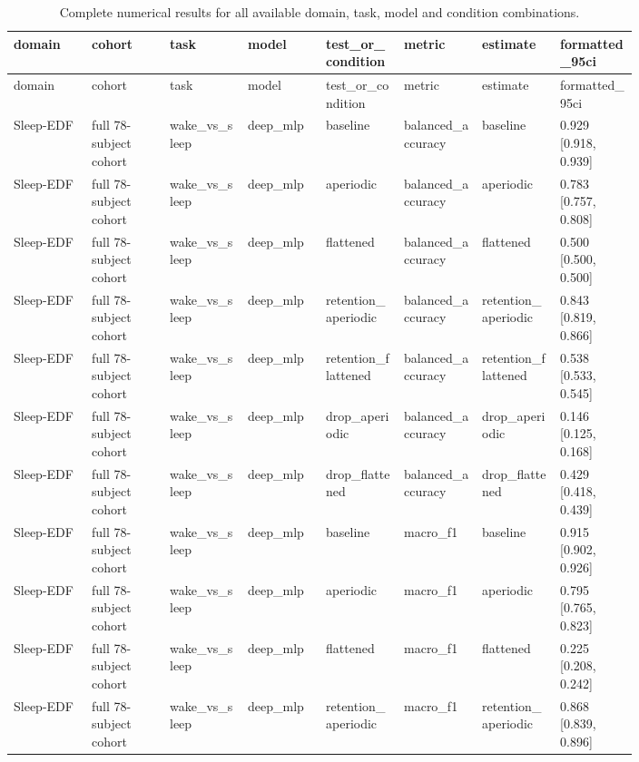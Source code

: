 \begin{longtable}{p{0.10\linewidth}p{0.10\linewidth}p{0.10\linewidth}p{0.10\linewidth}p{0.10\linewidth}p{0.10\linewidth}p{0.10\linewidth}p{0.10\linewidth}}
\caption{Complete numerical results for all available domain, task, model and condition combinations.}\label{tab:supp_complete_results}\\
\toprule
domain & cohort & task & model & test\_or\_condition & metric & estimate & formatted\_95ci\\
\midrule
\endfirsthead
\toprule
domain & cohort & task & model & test\_or\_condition & metric & estimate & formatted\_95ci\\
\midrule
\endhead
Sleep-EDF & full 78-subject cohort & wake\_vs\_sleep & deep\_mlp & baseline & balanced\_accuracy & baseline & 0.929 [0.918, 0.939]\\
Sleep-EDF & full 78-subject cohort & wake\_vs\_sleep & deep\_mlp & aperiodic & balanced\_accuracy & aperiodic & 0.783 [0.757, 0.808]\\
Sleep-EDF & full 78-subject cohort & wake\_vs\_sleep & deep\_mlp & flattened & balanced\_accuracy & flattened & 0.500 [0.500, 0.500]\\
Sleep-EDF & full 78-subject cohort & wake\_vs\_sleep & deep\_mlp & retention\_aperiodic & balanced\_accuracy & retention\_aperiodic & 0.843 [0.819, 0.866]\\
Sleep-EDF & full 78-subject cohort & wake\_vs\_sleep & deep\_mlp & retention\_flattened & balanced\_accuracy & retention\_flattened & 0.538 [0.533, 0.545]\\
Sleep-EDF & full 78-subject cohort & wake\_vs\_sleep & deep\_mlp & drop\_aperiodic & balanced\_accuracy & drop\_aperiodic & 0.146 [0.125, 0.168]\\
Sleep-EDF & full 78-subject cohort & wake\_vs\_sleep & deep\_mlp & drop\_flattened & balanced\_accuracy & drop\_flattened & 0.429 [0.418, 0.439]\\
Sleep-EDF & full 78-subject cohort & wake\_vs\_sleep & deep\_mlp & baseline & macro\_f1 & baseline & 0.915 [0.902, 0.926]\\
Sleep-EDF & full 78-subject cohort & wake\_vs\_sleep & deep\_mlp & aperiodic & macro\_f1 & aperiodic & 0.795 [0.765, 0.823]\\
Sleep-EDF & full 78-subject cohort & wake\_vs\_sleep & deep\_mlp & flattened & macro\_f1 & flattened & 0.225 [0.208, 0.242]\\
Sleep-EDF & full 78-subject cohort & wake\_vs\_sleep & deep\_mlp & retention\_aperiodic & macro\_f1 & retention\_aperiodic & 0.868 [0.839, 0.896]\\

\end{longtable}
